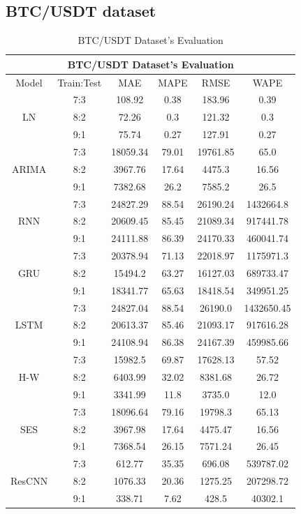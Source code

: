 \documentclass{ieeeojies}
\begin{document}
\subsection{BTC/USDT dataset}
\begin{table}[H]
    \centering
    \begin{tabular}{|c|c|c|c|c|c|}
         \hline
         \multicolumn{6}{|c|}{\textbf{BTC/USDT Dataset's Evaluation}}\\
         \hline
         \centering Model & Train:Test & MAE & MAPE & RMSE & WAPE \\ 
         \hline
         \multirow{3}{*}{LN} & 7:3 & 108.92 & 0.38 & 183.96 & 0.39 \\ & 8:2 & 72.26 & 0.3 & 121.32 & 0.3 \\ & 9:1 & 75.74 & 0.27 & 127.91 & 0.27 \\ 
         \hline
         \multirow{3}{*}{ARIMA} & 7:3 & 18059.34 & 79.01 & 19761.85 & 65.0 \\ & 8:2 & 3967.76 & 17.64 & 4475.3 & 16.56 \\ & 9:1 & 7382.68 & 26.2 & 7585.2 & 26.5 \\
         \hline
         \multirow{3}{*}{RNN} & 7:3 & 24827.29 & 88.54 & 26190.24 & 1432664.8 \\ & 8:2 & 20609.45 & 85.45 & 21089.34 & 917441.78 \\ & 9:1 & 24111.88 & 86.39 & 24170.33 & 460041.74 \\
         \hline
         \multirow{3}{*}{GRU} & 7:3 & 20378.94 & 71.13 & 22018.97 & 1175971.3 \\ & 8:2 & 15494.2 & 63.27 & 16127.03 & 689733.47 \\ & 9:1 & 18341.77 & 65.63 & 18418.54 & 349951.25 \\
         \hline
         \multirow{3}{*}{LSTM} & 7:3 & 24827.04 & 88.54 & 26190.0 & 1432650.45 \\ & 8:2 & 20613.37 & 85.46 & 21093.17 & 917616.28 \\ & 9:1 & 24108.94 & 86.38 & 24167.39 & 459985.66 \\
         \hline
         \multirow{3}{*}{H-W} & 7:3 & 15982.5 & 69.87 & 17628.13 & 57.52 \\ & 8:2 & 6403.99 & 32.02 & 8381.68 & 26.72 \\ & 9:1 & 3341.99 & 11.8 & 3735.0 & 12.0 \\
         \hline
         \multirow{3}{*}{SES} & 7:3 & 18096.64 & 79.16 & 19798.3 & 65.13 \\ & 8:2 & 3967.98 & 17.64 & 4475.47 & 16.56 \\ & 9:1 & 7368.54 & 26.15 & 7571.24 & 26.45 \\
         \hline
         \multirow{3}{*}{ResCNN} & 7:3 & 612.77 & 35.35 & 696.08 & 539787.02 \\ & 8:2 & 1076.33 & 20.36 & 1275.25 & 207298.72 \\ & 9:1 & 338.71 & 7.62 & 428.5 & 40302.1 \\
         \hline
    \end{tabular}
    \caption{BTC/USDT Dataset's Evaluation}
    \label{btcresult}
\end{table}
\end{document}

